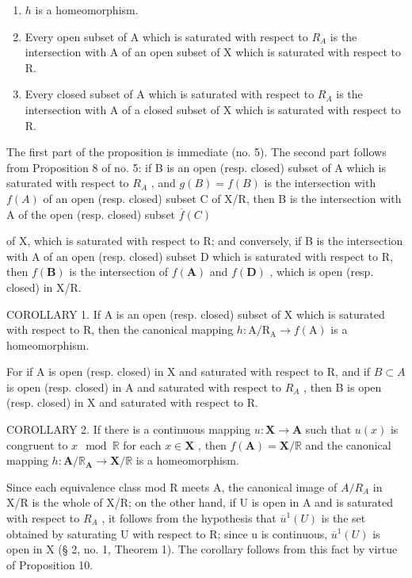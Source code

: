 \begin{enumerate}
\def\labelenumi{\alph{enumi})}
\item
  \(h\) is a homeomorphism.
\item
  Every open subset of A which is saturated with respect to \(R_{A}\) is the intersection with A of an open subset of X which is saturated with respect to R.
\item
  Every closed subset of A which is saturated with respect to \(R_{A}\) is the intersection with A of a closed subset of X which is saturated with respect to R.
\end{enumerate}

The first part of the proposition is immediate (no. 5). The second part follows from Proposition 8 of no. 5: if B is an open (resp. closed) subset of A which is saturated with respect to \(R_{A}\) , and \(g(B) = f(B)\) is the intersection with \(f(A)\) of an open (resp. closed) subset C of X/R, then B is the intersection with A of the open (resp. closed) subset \(\overline{f}(C)\)

of X, which is saturated with respect to R; and conversely, if B is the intersection with A of an open (resp. closed) subset D which is saturated with respect to R, then \(f(\mathbf{B})\) is the intersection of \(f(\mathbf{A})\) and \(f(\mathbf{D})\) , which is open (resp. closed) in X/R.

COROLLARY 1. If A is an open (resp. closed) subset of X which is saturated with respect to R, then the canonical mapping \(h: \mathrm{A}/\mathrm{R}_{\mathrm{A}} \rightarrow f(\mathrm{A})\) is a homeomorphism.

For if A is open (resp. closed) in X and saturated with respect to R, and if \(B \subset A\) is open (resp. closed) in A and saturated with respect to \(R_{A}\) , then B is open (resp. closed) in X and saturated with respect to R.

COROLLARY 2. If there is a continuous mapping \(u: \mathbf{X} \to \mathbf{A}\) such that \(u(x)\) is congruent to \(x \mod \mathbb{R}\) for each \(x \in \mathbf{X}\) , then \(f(\mathbf{A}) = \mathbf{X} / \mathbb{R}\) and the canonical mapping \(h: \mathbf{A} / \mathbb{R}_{\mathbf{A}} \to \mathbf{X} / \mathbb{R}\) is a homeomorphism.

Since each equivalence class mod R meets A, the canonical image of \(A/R_{A}\) in X/R is the whole of X/R; on the other hand, if U is open in A and is saturated with respect to \(R_{A}\) , it follows from the hypothesis that \(\overline{u}^{1}(U)\) is the set obtained by saturating U with respect to R; since u is continuous, \(\overline{u}^{1}(U)\) is open in X (§ 2, no. 1, Theorem 1). The corollary follows from this fact by virtue of Proposition 10.

